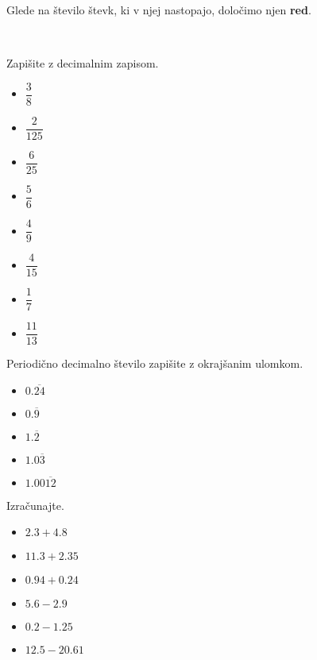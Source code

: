         Glede na število števk, ki v njej nastopajo, določimo njen \textbf{red}.

        


        ~\\

    \begin{naloga}
        Zapišite z decimalnim zapisom.
        \begin{itemize}
                    \item $\dfrac{3}{8}$ 
                    \item $\dfrac{2}{125}$ 
                    \item $\dfrac{6}{25}$ 
                    \item $\dfrac{5}{6}$ 
                    \item $\dfrac{4}{9}$ 
                    \item $\dfrac{4}{15}$ 
                    \item $\dfrac{1}{7}$ 
                    \item $\dfrac{11}{13}$ 
       \end{itemize}
    \end{naloga}



    \begin{naloga}
        Periodično decimalno število zapišite z okrajšanim ulomkom.
        \begin{itemize}
                    \item $0.\overline{24}$ 
                    \item $0.\overline{9}$ 
                    \item $1.\overline{2}$ 
                    \item $1.0\overline{3}$ 
                    \item $1.00\overline{12}$ 
        \end{itemize}
    \end{naloga}

    


    \begin{naloga}
        Izračunajte.
        \begin{itemize}
                    \item $2.3+4.8$ 
                    \item $11.3+2.35$ 
                    \item $0.94+0.24$ 
                    \item $5.6-2.9$ 
                    \item $0.2-1.25$ 
                    \item $12.5-20.61$ 
        \end{itemize}
    \end{naloga}

